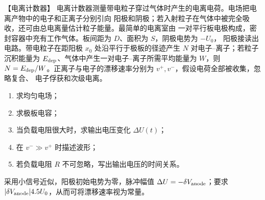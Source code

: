 \begin{origexamplebox}{【电离计数器】}\label{appE:ex:s22-33-6}
电离计数器测量带电粒子穿过气体时产生的电离电荷。电场把电离产物中的电子和正离子分别引向
阳极和阴极；若入射粒子在气体中被完全吸收，还可由总电离量估计粒子能量。最简单的电离室由
一对平行板电极构成，密封容器中充有工作气体。板间距为 $D$、面积为 $S$，阴极电势为 $-U_0$，
阳极接读出电路。带电粒子在距阳极 $x_0$ 处沿平行于极板的径迹产生 $N$ 对电子--离子；若粒子
沉积能量为 $E_{\rm dep}$、气体中产生一对电子--离子所需平均能量为 $W$，则
$N=E_{\rm dep}/W$。正离子与电子的漂移速率分别为 $v^+,v^-$，假设电荷全部被收集，忽略复合、
电子俘获和次级电离。
\begin{enumerate}[label=(\arabic*),leftmargin=2.2em]
  \item 求均匀电场；
  \item 求极板电容；
  \item 当负载电阻很大时，求输出电压变化 $\Delta U(t)$；
  \item 在 $v^-\gg v^+$ 时描述波形；
  \item 若负载电阻 $R$ 不可忽略，写出输出电压的时间关系。
\end{enumerate}

采用小信号近似，阳极初始电势为零，脉冲幅值 $\Delta U=-\delta V_{\rm anode}$；要求 $|\delta V_{\rm anode}|\ll U_0$，从而可将漂移速率视为常量。

\end{origexamplebox}

